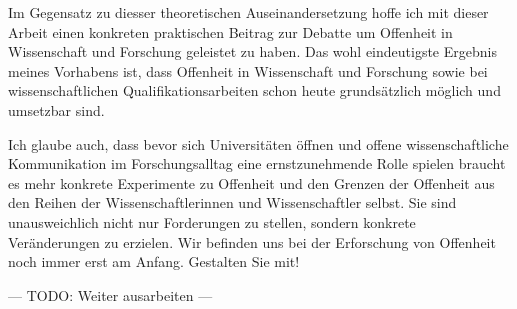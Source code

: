 \begin{vorspann}
Im Gegensatz zu diesser theoretischen Auseinandersetzung hoffe ich mit dieser Arbeit einen konkreten praktischen Beitrag zur Debatte um Offenheit in Wissenschaft und Forschung geleistet zu haben. Das wohl eindeutigste Ergebnis meines Vorhabens ist, dass Offenheit in Wissenschaft und Forschung sowie bei wissenschaftlichen Qualifikationsarbeiten schon heute grundsätzlich möglich und umsetzbar sind.

Ich glaube auch, dass bevor sich Universitäten öffnen und offene wissenschaftliche Kommunikation im Forschungsalltag eine ernstzunehmende Rolle spielen braucht es mehr konkrete Experimente zu Offenheit und den Grenzen der Offenheit aus den Reihen der Wissenschaftlerinnen und Wissenschaftler selbst. Sie sind unausweichlich nicht nur Forderungen zu stellen, sondern konkrete Veränderungen zu erzielen. Wir befinden uns bei der Erforschung von Offenheit noch immer erst am Anfang. Gestalten Sie mit!

--- TODO: Weiter ausarbeiten ---
\end{vorspann}
